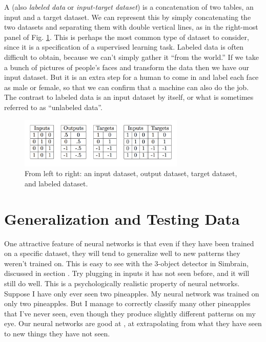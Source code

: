 A  (also \emph{labeled data} or \emph{input-target dataset}) is a concatenation of two tables, an input and a target dataset. We can represent this by simply concatenating the two datasets and separating them with double vertical lines, as in the right-most panel of Fig. \ref{datasetTypes}. This is perhaps the most common type of dataset to consider, since it is a specification of a supervised learning task. Labeled data is often difficult to obtain, because we can't simply gather it ``from the world.''  If we take a bunch of pictures of people's faces and transform the data then we have our input dataset. But it is an extra step for a human to come in and label each face as male or female, so that we can confirm that a machine can also do the job. The contrast to labeled  data  is an input dataset by itself, or what is sometimes referred to as ``unlabeled data''. 

\begin{figure}[h]
\centering
\includegraphics[width=0.7\textwidth]{./images/datasetTypes.png}
\caption[Jeff Yoshimi.]{From left to right: an input dataset, output dataset, target dataset, and labeled dataset.}
\label{datasetTypes}
\end{figure}

\section{Generalization and Testing Data }\label{generalization}

One attractive feature of neural networks is that even if they have been trained on a specific dataset, they will tend to generalize well to new patterns they weren't trained on. This is easy to see with the 3-object detector in Simbrain, discussed in section . Try plugging in inputs it has not seen before, and it will still do well. This is a psychologically realistic property of neural networks. Suppose I have only ever seen two pineapples. My neural network was trained on only two pineapples. But I manage to correctly classify many other pineapples that I've never seen, even though they produce slightly different patterns on my eye. Our neural networks are good at , at extrapolating from what they have seen to new things they have not seen.

